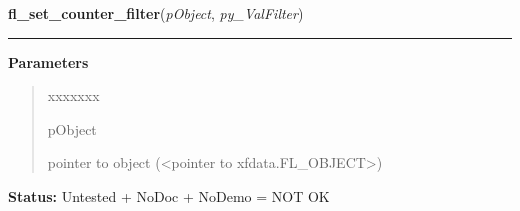 \hspace{.8\funcindent}\begin{boxedminipage}{\funcwidth}

    \raggedright \textbf{fl\_set\_counter\_filter}(\textit{pObject}, \textit{py\_ValFilter})

    \vspace{-1.5ex}

    \rule{\textwidth}{0.5\fboxrule}
\setlength{\parskip}{2ex}
\setlength{\parskip}{1ex}
      \textbf{Parameters}
      \vspace{-1ex}

      \begin{quote}
        \begin{Ventry}{xxxxxxx}

          \item[pObject]

          pointer to object ({\textless}pointer to 
          xfdata.FL\_OBJECT{\textgreater})

        \end{Ventry}

      \end{quote}

\textbf{Status:} Untested + NoDoc + NoDemo = NOT OK



    \end{boxedminipage}

    \label{xformslib:library:fl_get_counter_repeat}

    \vspace{0.5ex}

